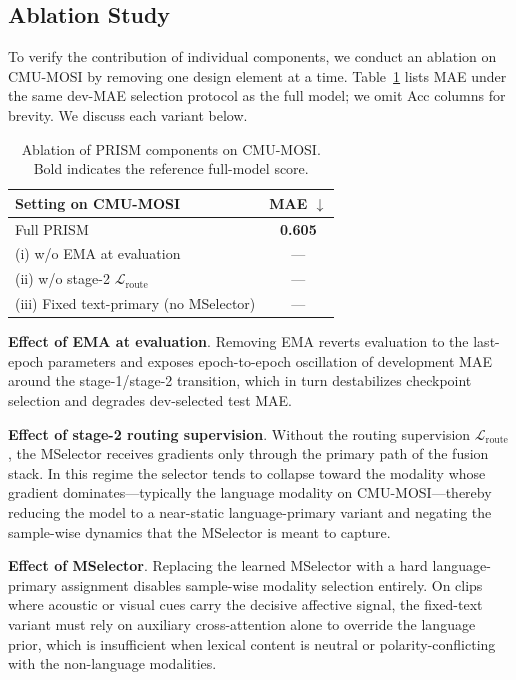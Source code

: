 \subsection{Ablation Study}
\label{sec:res-abl}
To verify the contribution of individual components, we conduct an ablation
on CMU-MOSI by removing one design element at a time.
Table~\ref{tab:abla} lists MAE under the same dev-MAE selection protocol as
the full model; we omit Acc columns for brevity.
We discuss each variant below.

\begin{table}[t]
  \centering
  \footnotesize
  \begin{tabular}{lc}
    \toprule
    \textbf{Setting on CMU-MOSI} & \textbf{MAE} $\downarrow$ \\
    \midrule
    Full PRISM & \textbf{0.605} \\
    \midrule
    (i) w/o EMA at evaluation & --- \\
    (ii) w/o stage-2 $\mathcal{L}_{\mathrm{route}}$ & --- \\
    (iii) Fixed text-primary (no MSelector) & --- \\
    \bottomrule
  \end{tabular}
  \caption{Ablation of PRISM components on CMU-MOSI.
    Bold indicates the reference full-model score.}
  \label{tab:abla}
\end{table}

\noindent \textbf{Effect of EMA at evaluation}.
Removing EMA reverts evaluation to the last-epoch parameters and exposes
epoch-to-epoch oscillation of development MAE around the stage-1/stage-2
transition, which in turn destabilizes checkpoint selection and degrades
dev-selected test MAE.

\noindent \textbf{Effect of stage-2 routing supervision}.
Without the routing supervision $\mathcal{L}_{\mathrm{route}}$, the MSelector
receives gradients only through the primary path of the fusion stack.
In this regime the selector tends to collapse toward the modality whose
gradient dominates---typically the language modality on CMU-MOSI---thereby
reducing the model to a near-static language-primary variant and negating
the sample-wise dynamics that the MSelector is meant to capture.

\noindent \textbf{Effect of MSelector}.
Replacing the learned MSelector with a hard language-primary assignment
disables sample-wise modality selection entirely.
On clips where acoustic or visual cues carry the decisive affective signal,
the fixed-text variant must rely on auxiliary cross-attention alone to
override the language prior, which is insufficient when lexical content is
neutral or polarity-conflicting with the non-language modalities.

